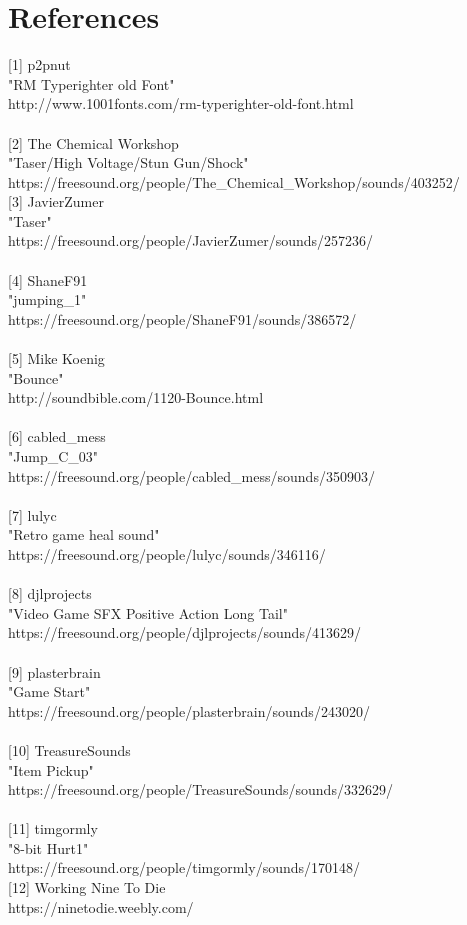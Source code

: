 \documentclass[10pt, a4paper]{article}
\begin{document}
\section {References}
{[1]} p2pnut\\
"RM Typerighter old Font"\\
http://www.1001fonts.com/rm-typerighter-old-font.html\\
\\
{[2]} The Chemical Workshop \\
"Taser/High Voltage/Stun Gun/Shock"\\
https://freesound.org/people/The\_Chemical\_Workshop/sounds/403252/
\\
{[3]} JavierZumer\\
"Taser"\\
https://freesound.org/people/JavierZumer/sounds/257236/\\
\\
{[4]} ShaneF91\\
"jumping\_1"\\
https://freesound.org/people/ShaneF91/sounds/386572/\\
\\
{[5]} Mike Koenig\\
"Bounce"\\
http://soundbible.com/1120-Bounce.html\\
\\
{[6]} cabled\_mess\\
"Jump\_C\_03"\\
https://freesound.org/people/cabled\_mess/sounds/350903/\\
\\
{[7]} lulyc\\
"Retro game heal sound"\\
https://freesound.org/people/lulyc/sounds/346116/\\
\\
{[8]} djlprojects\\
"Video Game SFX Positive Action Long Tail"\\
https://freesound.org/people/djlprojects/sounds/413629/\\
\\
{[9]} plasterbrain\\
"Game Start"\\
https://freesound.org/people/plasterbrain/sounds/243020/\\
\\
{[10]} TreasureSounds\\
"Item Pickup"\\
https://freesound.org/people/TreasureSounds/sounds/332629/\\
\\
{[11]} timgormly\\
"8-bit Hurt1"\\
https://freesound.org/people/timgormly/sounds/170148/\\

{[12]} Working Nine To Die\\
https://ninetodie.weebly.com/


		
\end{document}
